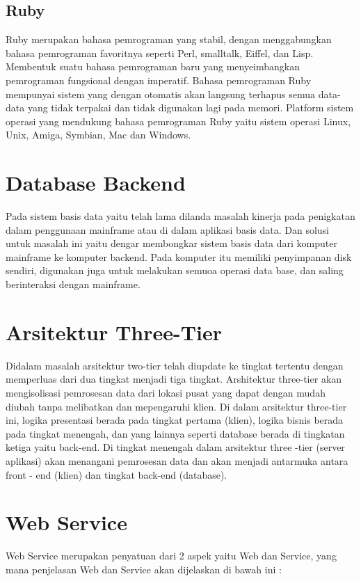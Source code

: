 \subsection{Ruby}
Ruby merupakan bahasa pemrograman yang stabil, dengan menggabungkan bahasa pemrograman favoritnya seperti Perl, smalltalk, Eiffel, dan Lisp.
Membentuk suatu bahasa pemrograman baru yang menyeimbangkan pemrograman fungsional dengan imperatif.
Bahasa pemrograman Ruby mempunyai sistem yang dengan otomatis akan langsung terhapus semua data-data yang tidak terpakai dan tidak digunakan lagi pada memori. 
Platform sistem operasi yang mendukung bahasa pemrograman Ruby yaitu sistem operasi Linux, Unix, Amiga, Symbian, Mac dan Windows.

\section{Database Backend}
Pada sistem basis data yaitu telah lama dilanda masalah kinerja pada penigkatan dalam penggunaan mainframe atau di dalam aplikasi basis data. Dan solusi untuk masalah ini yaitu dengar membongkar sistem basis data dari komputer mainframe ke komputer backend. Pada komputer itu memiliki penyimpanan disk sendiri, digunakan juga untuk melakukan semuoa operasi data base, dan saling berinteraksi dengan mainframe.


\section{Arsitektur Three-Tier}
Didalam masalah arsitektur two-tier telah diupdate ke tingkat tertentu dengan memperluas dari dua tingkat menjadi tiga tingkat.
Arshitektur three-tier akan mengisolisasi pemrosesan data dari lokasi pusat yang dapat dengan mudah diubah tanpa melibatkan dan mepengaruhi klien. Di dalam arsitektur three-tier ini, logika presentasi berada pada tingkat pertama (klien), logika bisnis berada pada 
tingkat menengah, dan yang lainnya seperti database berada di tingkatan ketiga yaitu back-end. Di tingkat menengah dalam
arsitektur three -tier (server aplikasi) akan menangani pemrosesan data dan akan menjadi antarmuka antara front - end (klien) dan
tingkat back-end (database).


\section{Web Service}
Web Service merupakan penyatuan dari 2 aspek yaitu Web dan Service, yang mana penjelasan Web dan Service akan dijelaskan di bawah ini :

